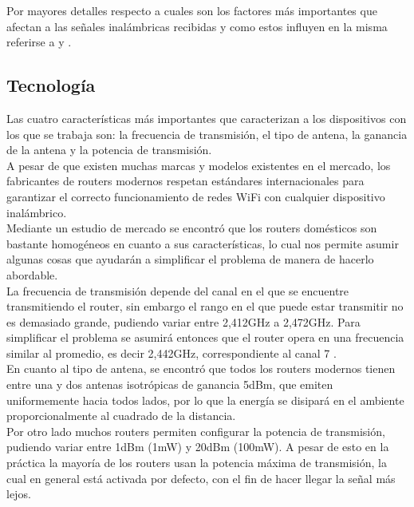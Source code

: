 \documentclass[journal]{IEEEtran}
\begin{document}
Por mayores detalles respecto a cuales son los factores más importantes que afectan a las señales inalámbricas recibidas y como estos influyen en la misma referirse a \cite{fuzzy:logic:based:system} y \cite{radar:tracking:system}.\\

\subsection{Tecnología}

Las cuatro características más importantes que caracterizan a los dispositivos con los que se trabaja son: la frecuencia de transmisión, el tipo de antena, la ganancia de la antena y la potencia de transmisión.\\

A pesar de que existen muchas marcas y modelos existentes en el mercado, los fabricantes de routers modernos respetan estándares internacionales para garantizar el correcto funcionamiento de redes WiFi con cualquier dispositivo inalámbrico.\\

Mediante un estudio de mercado se encontró que los routers domésticos son bastante homogéneos en cuanto a sus características, lo cual nos permite asumir algunas cosas que ayudarán a simplificar el problema de manera de hacerlo abordable.\\

La frecuencia de transmisión depende del canal en el que se encuentre transmitiendo el router, sin embargo el rango en el que puede estar transmitir no es demasiado grande, pudiendo variar entre 2,412GHz a 2,472GHz. Para simplificar el problema se asumirá entonces que el router opera en una frecuencia similar al promedio, es decir 2,442GHz, correspondiente al canal 7 \cite{wifi:channels}.\\

En cuanto al tipo de antena, se encontró que todos los routers modernos tienen entre una y dos antenas isotrópicas de ganancia 5dBm, que emiten uniformemente hacia todos lados, por lo que la energía se disipará en el ambiente proporcionalmente al cuadrado de la distancia.\\

Por otro lado muchos routers permiten configurar la potencia de transmisión, pudiendo variar entre 1dBm (1mW) y 20dBm (100mW). A pesar de esto en la práctica la mayoría de los routers usan la potencia máxima de transmisión, la cual en general está activada por defecto, con el fin de hacer llegar la señal más lejos.\\
\end{document}
